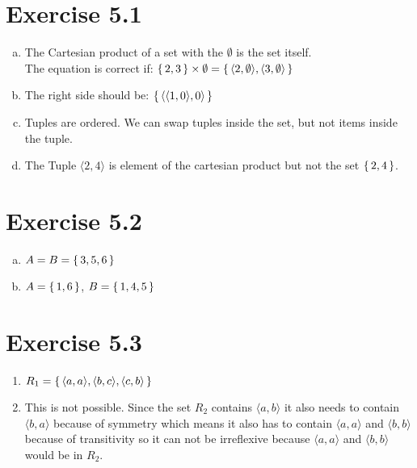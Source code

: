 \documentclass{article} %
\newcommand{\homeworkNumber}{5}
\begin{document}
\section*{Exercise \homeworkNumber.1}

\begin{enumerate}[a)]
	\item The Cartesian product of a set with the $\emptyset$ is the set itself.\\ The equation is correct if: $\set{2, 3} \times \emptyset = \set{\langle 2, \emptyset \rangle, \langle 3, \emptyset \rangle}$
	
	\item The right side should be: $\set{\langle \langle 1,0 \rangle , 0 \rangle}$
	
	\item Tuples are ordered. We can swap tuples inside the set, but not items inside the tuple.
	
	\item The Tuple $\langle 2,4 \rangle$ is element of the cartesian product but not the set $\set{2,4}$.
	
	
	
\end{enumerate}

\section*{Exercise \homeworkNumber.2}

\begin{enumerate}[a)]

\item $A = B = \set{3,5,6}$

\item $A = \set{1,6}$, $B = \set{1,4,5}$

\end{enumerate}




\section*{Exercise \homeworkNumber.3}

\begin{enumerate}
\item $R_1 = \set{\langle a,a \rangle, \langle b,c \rangle, \langle c,b \rangle}$

\item This is not possible. Since the set $R_2$ contains $\langle a,b \rangle$ it also needs to contain $\langle b,a \rangle$ because of symmetry which means it also has to contain $\langle a,a \rangle$ and $\langle b,b \rangle$ because of transitivity so it can not be irreflexive because $\langle a,a \rangle$ and $\langle b,b \rangle$ would be in $R_2$.

\end{enumerate}
\end{document}

